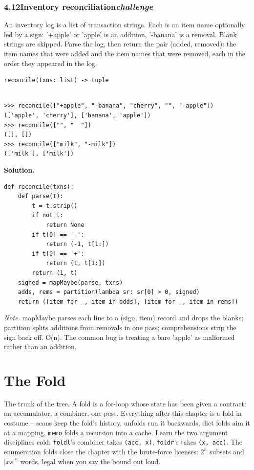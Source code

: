 \documentclass[10pt,letterpaper]{book}
\begin{document}
\subsection*{4.12\quad Inventory reconciliation\hfill\textnormal{\textit{challenge}}}
An inventory log is a list of transaction strings. Each is an item name optionally led by a sign: '+apple' or 'apple' is an addition, '-banana' is a removal. Blank strings are skipped. Parse the log, then return the pair (added, removed): the item names that were added and the item names that were removed, each in the order they appeared in the log.

\noindent\texttt{reconcile(txns: list) -> tuple}
\begin{lstlisting}[style=ex]

>>> reconcile(["+apple", "-banana", "cherry", "", "-apple"])
(['apple', 'cherry'], ['banana', 'apple'])
>>> reconcile(["", "  "])
([], [])
>>> reconcile(["milk", "-milk"])
(['milk'], ['milk'])

\end{lstlisting}
\noindent\textbf{Solution.}
\begin{lstlisting}[style=code]
def reconcile(txns):
    def parse(t):
        t = t.strip()
        if not t:
            return None
        if t[0] == '-':
            return (-1, t[1:])
        if t[0] == '+':
            return (1, t[1:])
        return (1, t)
    signed = mapMaybe(parse, txns)
    adds, rems = partition(lambda sr: sr[0] > 0, signed)
    return ([item for _, item in adds], [item for _, item in rems])
\end{lstlisting}
\noindent\textit{Note.} mapMaybe parses each line to a (sign, item) record and drops the blanks; partition splits additions from removals in one pass; comprehensions strip the sign back off. O(n). The common bug is treating a bare 'apple' as malformed rather than an addition.

\clearpage
\chapter{The Fold}

The trunk of the tree. A fold is a for-loop whose state has been given a
contract: an accumulator, a combiner, one pass. Everything after this chapter
is a fold in costume -- scans keep the fold's history, unfolds run it
backwards, dict folds aim it at a mapping, \texttt{memo} folds a recursion
into a cache. Learn the two argument disciplines cold: \texttt{foldl}'s
combiner takes \texttt{(acc, x)}, \texttt{foldr}'s takes \texttt{(x, acc)}.
The enumeration folds close the chapter with the brute-force licenses:
$2^n$ subsets and $|xs|^n$ words, legal when you say the bound out loud.
\end{document}
